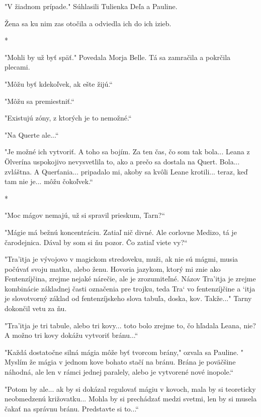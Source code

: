 \documentclass{book}
\begin{document}
"$ $V žiadnom prípade."$ $ Súhlasili Tulienka Deľa a Pauline.

Žena sa ku nim zas otočila a odviedla ich do ich izieb.

\begin{center}
*
\end{center}

"$ $Mohli by už byť späť."$ $ Povedala Morja Belle. Tá sa zamračila a pokrčila plecami.

"$ $Môžu byť kdekoľvek, ak ešte žijú.“

"$ $Môžu sa premiestniť.“

"$ $Existujú zóny, z ktorých je to nemožné.“

"$ $Na Querte ale...“

"$ $Je možné ich vytvoriť. A toho sa bojím. Za ten čas, čo som tak bola... Leana z Ölverína uspokojivo nevysvetlila to, ako a prečo sa dostala na Quert. Bola... zvláštna. A Querťania... pripadalo mi, akoby sa kvôli Leane krotili... teraz, keď tam nie je... môžu čokoľvek.“

\begin{center}
*
\end{center}

"$ $Moc mágov nemajú, už si spravil prieskum, Tarn?“

"$ $Mágie má bežnú koncentráciu. Zatiaľ nič divné. Ale corlovne Medizo, tá je čarodejnica. Dával by som si ňu pozor. Čo zatiaľ viete vy?“

"$ $Tra'itja je vývojovo v magickom stredoveku, muži, ak nie sú mágmi, musia počúvať svoju matku, alebo ženu. Hovoria jazykom, ktorý mi znie ako Fentenzíjčina, zrejme nejaké nárečie, ale je zrozumiteľné. Názov Tra'itja je zrejme kombinácie základnej časti označenia pre trojku, teda Tra‘ vo fentenzíjčine a ‘itja je slovotvorný základ od fentenzíjskeho slova tabuľa, doska, kov. Takže..."$ $ Tarny dokončil vetu za ňu.

"$ $Tra'itja je tri tabule, alebo tri kovy... toto bolo zrejme to, čo hľadala Leana, nie? A možno tri kovy dokážu vytvoriť bránu...“

"$ $Každá dostatočne silná mágia môže byť tvorcom brány,"$ $ ozvala sa Pauline. "$ $Myslím že mágia v jednom kove bohato stačí na bránu. Brána je poväčšine náhodná, ale len v rámci jednej paralely, alebo je vytvorené nové inopole.“

"$ $Potom by ale... ak by si dokázal regulovať mágiu v kovoch, mala by si teoreticky neobmedzenú križovatku... Mohla by si prechádzať medzi svetmi, len by si musela čakať na správnu bránu. Predstavte si to...“
\end{document}
